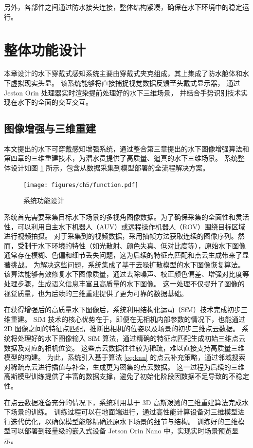 另外，各部件之间通过防水接头连接，整体结构紧凑，确保在水下环境中的稳定运行。

\section{整体功能设计}
本章设计的水下穿戴式感知系统主要由穿戴式夹克组成，其上集成了防水舱体和水下虚拟现实头显。
该系统能够将直接捕捉视觉数据反馈至头戴式显示器，
通过 Jeston Orin 处理器实时渲染提前处理好的水下三维场景，
并结合手势识别技术实现在水下的全面的交互交互。

\subsection{图像增强与三维重建}
本文提出的水下可穿戴感知增强系统，通过整合第三章提出的水下图像增强算法和第四章的三维重建技术，为潜水员提供了高质量、逼真的水下三维场景。
系统整体设计如图 \ref{img:function} 所示，包含从数据采集到模型部署的全流程解决方案。
\begin{figure}[ht]
    \centering
    \texttt{[image: figures/ch5/function.pdf]}
    \caption{系统功能设计}
    \label{img:function}
\end{figure}

系统首先需要采集目标水下场景的多视角图像数据。为了确保采集的全面性和灵活性，可以利用自主水下机器人（AUV）或远程操作机器人（ROV）围绕目标区域进行视频拍摄。
对于采集到的视频数据，采用抽帧方法获取连续的图像序列。然而，受制于水下环境的特性（如光散射、颜色失真、低对比度等），原始水下图像通常存在模糊、色偏和细节丢失问题，这为后续的特征点匹配和点云生成带来了显著挑战。
为解决这些问题，系统集成了基于去噪扩散模型的水下图像恢复算法。该算法能够有效修复水下图像质量，通过去除噪声、校正颜色偏差、增强对比度等处理步骤，生成语义信息丰富且高质量的水下图像。
这一处理不仅提升了图像的视觉质量，也为后续的三维重建提供了更为可靠的数据基础。

在获得增强后的高质量水下图像后，系统利用结构化运动（SfM）技术完成初步三维重建。
SfM 技术的核心优势在于，即便在无相机内部参数的情况下，也能通过 2D 图像之间的特征点匹配，推断出相机的位姿以及场景的初步三维点云数据。
系统将处理好的水下图像输入 SfM 算法，通过精确的特征点匹配生成初始三维点云数据及对应的相机位姿。
这些点云数据往往较为稀疏，难以直接支持高质量三维模型的构建。
为此，系统引入基于算法 \ref{eq:knn} 的点云补充策略，通过邻域搜索对稀疏点云进行插值与补全，生成更为密集的点云数据。
这一过程为后续的三维高斯模型训练提供了丰富的数据支撑，避免了初始化阶段因数据不足导致的不稳定性。

在点云数据准备充分的情况下，系统利用基于 3D 高斯泼溅的三维重建算法完成水下场景的训练。
训练过程可以在地面端进行，通过高性能计算设备对三维模型进行迭代优化，以确保模型能够精确还原水下场景的细节与结构。
训练好的三维模型可以部署到轻量级的嵌入式设备 Jetson Orin Nano 中，实现实时场景预览显示。


